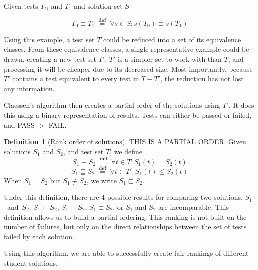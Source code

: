 \documentclass[11pt,twoside]{article}
\newcommand\defined{\mathrel{\;\stackrel{\scriptscriptstyle\mathbf{def}}{=}\;}}
\theoremstyle{definition}
\newtheorem{defn}{Definition}
\begin{document}
\centerline{Given tests $T_O$ and $T_1$ and solution set $S$}
$$ T_0 \equiv T_1 \defined \forall s \in S : s(T_0) \equiv s(T_1) $$


Using this example, a test set $T$ could be reduced into a set of its equivalence classes. From these equivalence classes, a single representative example could be drawn, creating a new test set $T'$. $T'$ is a simpler set to work with than $T$, and processing it will be cheaper due to its decreased size. Most importantly, because $T'$ contains a test equivalent to every test in $T - T'$, the reduction has not lost any information.


Claessen's algorithm then creates a partial order of the solutions using $T'$. It does this using a binary representation of results. Tests can either be passed or failed, and PASS $>$ FAIL.

\begin{defn}[Rank order of solutions]
THIS IS A PARTIAL ORDER.
Given solutions $S_1$ and $S_2$, and test set $T$, we define
$$S_1 \equiv S_2 \defined \forall t \in T : S_1(t) = S_2(t)$$
$$S_1 \sqsubseteq S_2 \defined \forall t \in T' : S_1(t) \leq S_2(t)$$
When $S_1 \sqsubseteq S_2$ but $S_1 \not\equiv S_2$, we write
$S_1 \sqsubset S_2$.
\end{defn}
Under this definition, there are 4 possible results for comparing two solutions, $S_1$~and~$S_2$. 
$S_1 \sqsubset S_2$, $S_1 \sqsupset S_2$, $S_1 \equiv S_2$, or $S_1$ and $S_2$  are incomparable. This definition allows us to build a partial ordering. This ranking is not built on the number of failures, but only on the direct relationships between the set of tests failed by each solution.

Using this algorithm, we are able to successfully create fair rankings of different student solutions.
\end{document}
